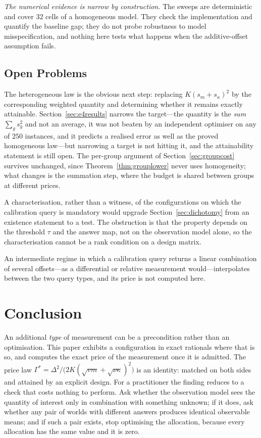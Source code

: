 \documentclass[conference]{IEEEtran}
\theoremstyle{definition}
\begin{document}
\emph{The numerical evidence is narrow by construction.} The sweeps are deterministic and
cover $32$ cells of a homogeneous model. They check the implementation and quantify the
baseline gap; they do not probe robustness to model misspecification, and nothing here tests
what happens when the additive-offset assumption fails.

\subsection{Open Problems}
\label{sec:opens}

The heterogeneous law is the obvious next step: replacing
$K(s_{m}+s_{\kappa})^{2}$ by the corresponding weighted quantity and determining
whether it remains exactly attainable. Section~\ref{sec:e4results} narrows the target---the
quantity is the \emph{sum} $\sum_{g}s_{g}^{2}$ and not an average, it was not beaten by an
independent optimiser on any of $250$ instances, and it predicts a realised error as well as
the proved homogeneous law---but narrowing a target is not hitting it, and the attainability
statement is still open. The per-group argument of
Section~\ref{sec:groupcost} survives unchanged, since Theorem~\ref{thm:grouplower} never
uses homogeneity; what changes is the summation step, where the budget is shared between
groups at different prices.

A characterisation, rather than a witness, of the configurations on which the calibration
query is mandatory would upgrade Section~\ref{sec:dichotomy} from an existence statement to
a test. The obstruction is that the property depends on the threshold $\tau$ and the answer
map, not on the observation model alone, so the characterisation cannot be a rank condition
on a design matrix.

An intermediate regime in which a calibration query returns a linear combination of several
offsets---as a differential or relative measurement would---interpolates between the two
query types, and its price is not computed here.

\section{Conclusion}

An additional \emph{type} of measurement can be a precondition rather than an optimisation.
This paper exhibits a configuration in exact rationals where that is so, and computes the
exact price of the measurement once it is admitted. The price law
$\Gamma^{*}=\Delta^{2}/\bigl(2K(\sqrt{vm}+\sqrt{\nu\kappa})^{2}\bigr)$ is an identity: matched
on both sides and attained by an explicit design. For a practitioner the finding reduces to
a check that costs nothing to perform. Ask whether the observation model sees the quantity
of interest only in combination with something unknown; if it does, ask whether any pair of
worlds with different answers produces identical observable means; and if such a pair
exists, stop optimising the allocation, because every allocation has the same value and it
is zero.
\end{document}
